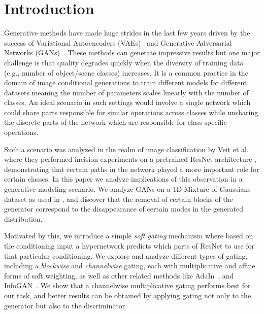 \section{Introduction}
Generative methods have made huge strides in the last few years driven by the success of Variational Autoencoders (VAEs)~\cite{kingma2013auto} and Generative Adversarial Networks (GANs)~\cite{goodfellow2014generative}. 
These methods can generate impressive results but one major challenge is that quality degrades quickly when the diversity of training data (e.g., number of object/scene classes) increases. 
It is a common practice in the domain of image conditional generations to train different models for different datasets \cite{goodfellow2014generative,isola2016image2image,karras2017progressive,zhu2017toward,zhu2017unpaired,wang2018video} meaning the number of parameters scales linearly with the number of classes. 
An ideal scenario in such settings would involve a single network which could share parts responsible for similar operations across classes while unsharing the discrete parts of the network which are responsible for class specific operations.

Such a scenario was analyzed in the realm of image classification by Veit et al.~\cite{veit2016residual} where they performed incision experiments on a pretrained ResNet architecture \cite{he2016deep}, demonstrating that certain paths in the network played a more important role for certain classes.
In this paper we analyze implications of this observation in a generative modeling scenario. 
We analyze GANs on a 1D Mixture of Gaussians dataset as used in \cite{ghosh2017multi}, and discover that the removal of certain blocks of the generator correspond to the disappearance of certain modes in the generated distribution.

Motivated by this, we introduce a simple {\em soft gating} mechanism where based on the conditioning input a hypernetwork predicts which parts of ResNet to use for that particular conditioning.
We explore and analyze different types of gating, including a {\em blockwise} and {\em channelwise} gating, each with multiplicative and affine forms of soft weighting, as well as other related methods like AdaIn~\cite{huang2017arbitrary,huang2018multimodal}, and InfoGAN~\cite{chen2016infogan}. We show that a channelwise multiplicative gating performs best for our task, and better results can be obtained by applying gating not only to the generator but also to the discriminator.


